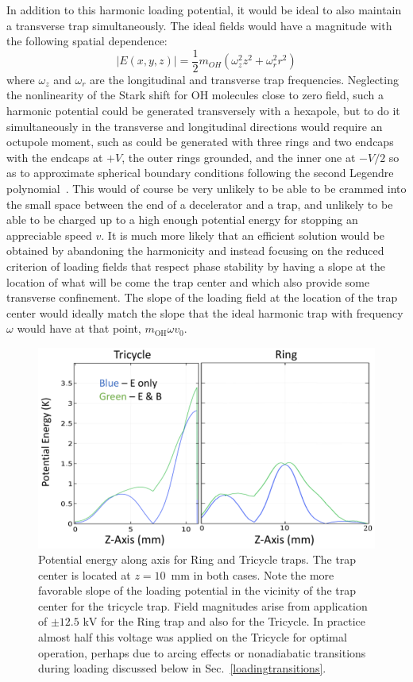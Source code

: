 \documentclass[defaultstyle,11pt]{thesis}
\begin{document}
In addition to this harmonic loading potential, it would be ideal to also maintain a transverse trap simultaneously. 
The ideal fields would have a magnitude with the following spatial dependence:
\begin{equation}
|E(x,y,z)| = \frac{1}{2}m_{OH}\left(\omega_z^2z^2 + \omega_r^2r^2\right)
\end{equation}
where $\omega_z$ and $\omega_r$ are the longitudinal and transverse trap frequencies.
Neglecting the nonlinearity of the Stark shift for OH molecules close to zero field, such a harmonic potential could be generated transversely with a hexapole, but to do it simultaneously in the transverse and longitudinal directions would require an octupole moment, such as could be generated with three rings and two endcaps with the endcaps at $+V$, the outer rings grounded, and the inner one at $-V/2$ so as to approximate spherical boundary conditions following the second Legendre polynomial~\cite{jackson1999classical}.
This would of course be very unlikely to be able to be crammed into the small space between the end of a decelerator and a trap, and unlikely to be able to be charged up to a high enough potential energy for stopping an appreciable speed $v$.
It is much more likely that an efficient solution would be obtained by abandoning the harmonicity and instead focusing on the reduced criterion of loading fields that respect phase stability by having a slope at the location of what will be come the trap center and which also provide some transverse confinement.
The slope of the loading field at the location of the trap center would ideally match the slope that the ideal harmonic trap with frequency $\omega$ would have at that point, $m_\text{OH}\omega v_0$.

\begin{figure}[t!]
\centering
\includegraphics[width=14cm]{LoadingFieldsEB.png}
\caption[On-Axis Loading for Ring and Tricycle]{\label{loadingringtrike}
Potential energy along axis for Ring and Tricycle traps. The trap center is located at $z=10$~mm in both cases. Note the more favorable slope of the loading potential in the vicinity of the trap center for the tricycle trap. Field magnitudes arise from application of $\pm12.5\text{ kV}$ for the Ring trap and also for the Tricycle. In practice almost half this voltage was applied on the Tricycle for optimal operation, perhaps due to arcing effects or nonadiabatic transitions during loading discussed below in Sec.~\ref{loadingtransitions}.
}
\end{figure}
\end{document}

